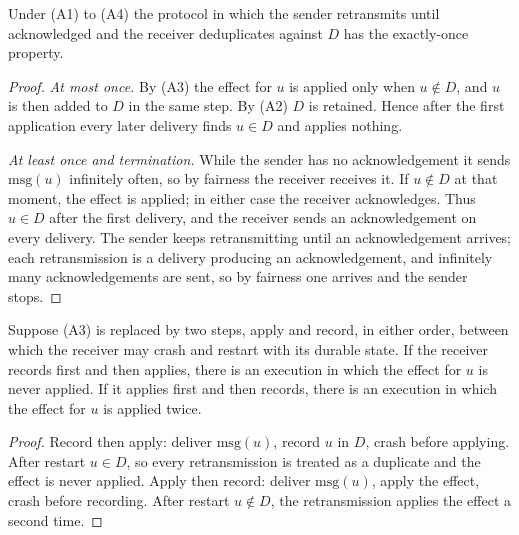 \begin{newresult}\label{thm:exactly-once}
Under (A1) to (A4) the protocol in which the sender retransmits until acknowledged and the receiver deduplicates against $D$ has the exactly-once property.
\end{newresult}
\begin{proof}
\emph{At most once.} By (A3) the effect for $u$ is applied only when $u\notin D$, and $u$ is then added to $D$ in the same step. By (A2) $D$ is retained. Hence after the first application every later delivery finds $u\in D$ and applies nothing.

\emph{At least once and termination.} While the sender has no acknowledgement it sends $\mathrm{msg}(u)$ infinitely often, so by fairness the receiver receives it. If $u\notin D$ at that moment, the effect is applied; in either case the receiver acknowledges. Thus $u\in D$ after the first delivery, and the receiver sends an acknowledgement on every delivery. The sender keeps retransmitting until an acknowledgement arrives; each retransmission is a delivery producing an acknowledgement, and infinitely many acknowledgements are sent, so by fairness one arrives and the sender stops.
\end{proof}

\begin{newresult}\label{prop:non-atomic}
Suppose (A3) is replaced by two steps, apply and record, in either order, between which the receiver may crash and restart with its durable state. If the receiver records first and then applies, there is an execution in which the effect for $u$ is never applied. If it applies first and then records, there is an execution in which the effect for $u$ is applied twice.
\end{newresult}
\begin{proof}
Record then apply: deliver $\mathrm{msg}(u)$, record $u$ in $D$, crash before applying. After restart $u\in D$, so every retransmission is treated as a duplicate and the effect is never applied. Apply then record: deliver $\mathrm{msg}(u)$, apply the effect, crash before recording. After restart $u\notin D$, the retransmission applies the effect a second time.
\end{proof}

